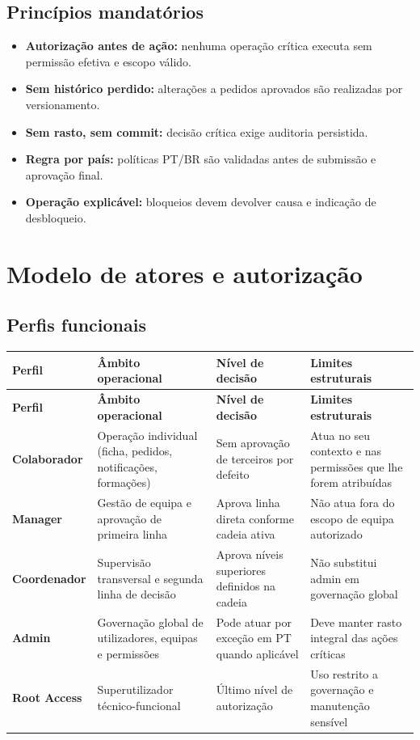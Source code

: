 \documentclass[11pt,a4paper,twoside]{article}
\newcommand{\tH}[1]{\textbf{\sffamily\small\color{white}#1}}
\newcommand{\theadrow}{\rowcolor{ACCENT}}
\begin{document}
\subsection{Princípios mandatórios}
\begin{itemize}
  \item \textbf{Autorização antes de ação:} nenhuma operação crítica executa sem permissão efetiva e escopo válido.
  \item \textbf{Sem histórico perdido:} alterações a pedidos aprovados são realizadas por versionamento.
  \item \textbf{Sem rasto, sem commit:} decisão crítica exige auditoria persistida.
  \item \textbf{Regra por país:} políticas PT/BR são validadas antes de submissão e aprovação final.
  \item \textbf{Operação explicável:} bloqueios devem devolver causa e indicação de desbloqueio.
\end{itemize}

\section{Modelo de atores e autorização}

\subsection{Perfis funcionais}
\begin{longtable}{>{\small\bfseries}p{2.2cm} >{\small}p{4.1cm} >{\small}p{3.5cm} >{\small}p{3.8cm}}
\theadrow
\tH{Perfil} & \tH{Âmbito operacional} & \tH{Nível de decisão} & \tH{Limites estruturais} \\
\midrule
\endfirsthead
\theadrow
\tH{Perfil} & \tH{Âmbito operacional} & \tH{Nível de decisão} & \tH{Limites estruturais} \\
\midrule
\endhead
Colaborador & Operação individual (ficha, pedidos, notificações, formações) & Sem aprovação de terceiros por defeito & Atua no seu contexto e nas permissões que lhe forem atribuídas \\
Manager & Gestão de equipa e aprovação de primeira linha & Aprova linha direta conforme cadeia ativa & Não atua fora do escopo de equipa autorizado \\
Coordenador & Supervisão transversal e segunda linha de decisão & Aprova níveis superiores definidos na cadeia & Não substitui admin em governação global \\
Admin & Governação global de utilizadores, equipas e permissões & Pode atuar por exceção em PT quando aplicável & Deve manter rasto integral das ações críticas \\
Root Access & Superutilizador técnico-funcional & Último nível de autorização & Uso restrito a governação e manutenção sensível \\
\bottomrule
\end{longtable}
\end{document}
